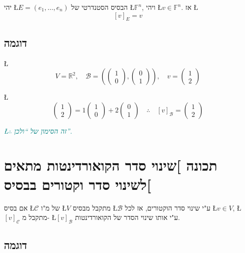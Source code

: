 \documentclass[english,hebrew]{article}
\begin{document}
יהי \L{$E=(e_{1},\dots,e_{n})$} הבסיס הסטנדרטי של \L{$\mathbb{F}^{n}$},
ויהי \L{$v\in\mathbb{F}^{n}$}. אז \L{%
\[
[v]_{E}=v
\]
}%

\subsection{דוגמה}

\L{%
\[
V=\mathbb{R}^{2},\quad\mathcal{B}=\left(\begin{pmatrix}1\\
0
\end{pmatrix},\begin{pmatrix}0\\
1
\end{pmatrix}\right),\quad v=\begin{pmatrix}1\\
2
\end{pmatrix}
\]
}%

\L{%
\[
\begin{pmatrix}1\\
2
\end{pmatrix}=1\begin{pmatrix}1\\
0
\end{pmatrix}+2\begin{pmatrix}0\\
1
\end{pmatrix}\quad\therefore\quad[v]_{\mathcal{B}}=\begin{pmatrix}1\\
2
\end{pmatrix}
\]
}%

{\small\textcolor{teal}{\emph{\L{$\therefore$} זה הסימון של \textquotedblleft ולכן\textquotedblright .}}}{\small\par}

\section{תכונה {]}שינוי סדר הקואורדינטות מתאים לשינוי סדר וקטורים בבסיס{[}}

אם בסיס \L{$\mathcal{C}$} של מ"ו \L{$V$} מתקבל מבסיס \L{$\mathcal{B}$}
ע"י שינוי סדר הוקטורים, אז לכל \L{$v\in V$}, \L{$[v]_{\mathcal{C}}$}
מתקבל מ- \L{$[v]_{\mathcal{B}}$} ע"י אותו שינוי הסדר של הקואורדינטות.

\subsection{דוגמה}
\end{document}
